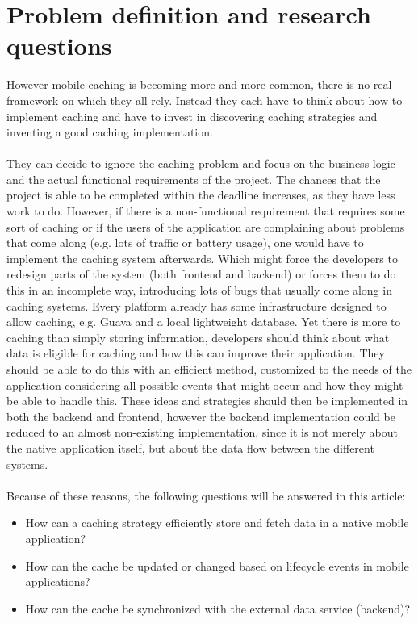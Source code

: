 \documentclass[pdftex,a4paper,12pt,twoside]{report}
\begin{document}
\section{Problem definition and research questions}
However mobile caching is becoming more and more common, there is no real framework on which they all rely. Instead they each have to think about how to implement
caching and have to invest in discovering caching strategies and inventing a good caching implementation.
\\\\
They can decide to ignore the caching problem and focus on the business logic and the actual functional requirements of the project. The chances that the
project is able to be completed within the deadline increases, as they have less work to do. However, if there is a non-functional requirement that requires some sort of caching
or if the users of the application are complaining about problems that come along (e.g. lots of traffic or battery usage), one would have to implement the caching system afterwards. Which might force the developers to redesign parts of the system (both frontend and backend) or forces them to do this in an incomplete way, introducing lots of bugs that usually come along in caching systems.
\label{sec:research questions}
Every platform already has some infrastructure designed to allow caching, e.g. Guava and a local lightweight database.
Yet there is more to caching than simply storing information, developers should think about what data is eligible for caching and how this can improve their application.
They should be able to do this with an efficient method, customized to the needs of the application considering all possible events that might occur and how they might be able to handle this. These ideas and strategies should then be implemented in both the backend and frontend, however the backend implementation could be reduced to an almost non-existing implementation, since it is not merely about the native application itself, but about the data flow between the different systems.
\\\\Because of these reasons, the following questions will be answered in this article:
\begin{itemize}
\item How can a caching strategy efficiently store and fetch data in a native mobile application?
\item How can the cache be updated or changed based on lifecycle events in mobile applications?
\item How can the cache be synchronized with the external data service (backend)?
\end{itemize}
\end{document}
